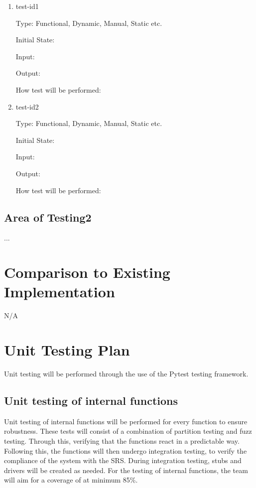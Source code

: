 \documentclass[12pt, titlepage]{article}
\begin{document}
\begin{enumerate}

\item{test-id1\\}

Type: Functional, Dynamic, Manual, Static etc.
                    
Initial State: 
                    
Input: 
                    
Output: 
                    
How test will be performed: 
                    
\item{test-id2\\}

Type: Functional, Dynamic, Manual, Static etc.
                    
Initial State: 
                    
Input: 
                    
Output: 
                    
How test will be performed: 

\end{enumerate}

\subsection{Area of Testing2}

...

    
\section{Comparison to Existing Implementation} 
N/A

\section{Unit Testing Plan}
Unit testing will be performed through the use of the Pytest testing framework.

\subsection{Unit testing of internal functions}
Unit testing of internal functions will be performed for every function to ensure robustness. These tests will consist of a combination of partition testing and fuzz testing. Through this, verifying that the functions react in a predictable way. Following this, the functions will then undergo integration testing, to verify the compliance of the system with the SRS. During integration testing, stubs and drivers will be created as needed. For the testing of internal functions, the team will aim for a coverage of at minimum 85\%.
\end{document}
